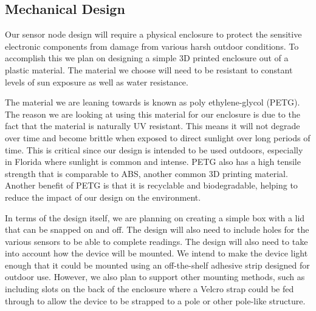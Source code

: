 \subsection{Mechanical Design}
Our sensor node design will require a physical enclosure to protect the sensitive electronic components from damage from various harsh outdoor conditions. To accomplish this we plan on designing a simple 3D printed enclosure out of a plastic material. The material we choose will need to be resistant to constant levels of sun exposure as well as water resistance.

The material we are leaning towards is known as poly ethylene-glycol (PETG). The reason we are looking at using this material for our enclosure is due to the fact that the material is naturally UV resistant. This means it will not degrade over time and become brittle when exposed to direct sunlight over long periods of time. This is critical since our design is intended to be used outdoors, especially in Florida where sunlight is common and intense. PETG also has a high tensile strength that is comparable to ABS, another common 3D printing material. Another benefit of PETG is that it is recyclable and biodegradable, helping to reduce the impact of our design on the environment.

In terms of the design itself, we are planning on creating a simple box with a lid that can be snapped on and off. The design will also need to include holes for the various sensors to be able to complete readings. The design will also need to take into account how the device will be mounted. We intend to make the device light enough that it could be mounted using an off-the-shelf adhesive strip designed for outdoor use. However, we also plan to support other mounting methods, such as including slots on the back of the enclosure where a Velcro strap could be fed through to allow the device to be strapped to a pole or other pole-like structure. %

